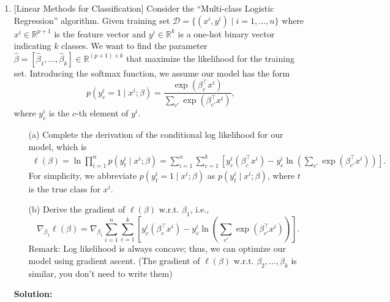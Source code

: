\documentclass[10pt]{article}
\begin{document}
\begin{enumerate}[1.]
	\item {} [Linear Methods for Classification] 
	Consider the ``Multi-class Logistic Regression'' algorithm. Given training set 
	$\mathcal{D}=\{(x^i,y^i)\mid i=1,\ldots,n\}$ where $x^i\in \mathbb{R}^{p+1}$ is the 
	feature vector and $y^i\in \mathbb{R}^{k}$ is a one-hot binary vector indicating 
	$k$ classes. We want to find the parameter $\hat{\beta}=[\hat{\beta}_1,\ldots,\hat{\beta}_k]\in \mathbb{R}^{(p+1)\times k}$ 
	that maximize the likelihood for the training set. Introducing the softmax 
	function, we assume our model has the form 
	\[
		p(y_c^i=1\mid x^i;\beta) = \frac{\exp(\beta_c^\top x^i)}{\sum_{c'}\exp(\beta_{c'}^\top x^i)},
	\]
	where $y_c^i$ is the $c$-th element of $y^i$.
		  \begin{itemize}
			\item[(a)] Complete the derivation of the conditional log likelihood for our model, which is
			\begin{align*}
				\ell(\beta) = \ln \prod_{i=1}^{n} p(y_t^i\mid x^i;\beta)
				=\sum_{i=1}^{n}\sum_{c=1}^{k}\left[ y_c^i(\beta_c^\top x^i) - y_c^i\ln \left(\sum_{c'}\exp(\beta_{c'}^\top x^i) \right)\right].
			\end{align*}
			For simplicity, we abbreviate $p(y_t^i=1\mid x^i;\beta)$ as $p(y_t^i\mid x^i;\beta)$, where 
			$t$ is the true class for $x^i$.~
			\item[(b)] Derive the gradient of $\ell(\beta)$ w.r.t. $\beta_1$, i.e., 
			\[
				\nabla_{\beta_1}\ell(\beta) = \nabla_{\beta_1} \sum_{i=1}^{n}\sum_{c=1}^{k}\left[ y_c^i(\beta_c^\top x^i) - y_c^i\ln \left(\sum_{c'}\exp(\beta_{c'}^\top x^i) \right)\right].
			\]
			Remark: Log likelihood is always concave; thus, we can optimize our model 
			using gradient ascent. (The gradient of $\ell(\beta)$ w.r.t. $\beta_2,\ldots,\beta_k$ is similar, you don't need to write them)~
		  \end{itemize}
		  \textbf{Solution:}

	      \newpage


\end{enumerate}
\end{document}

